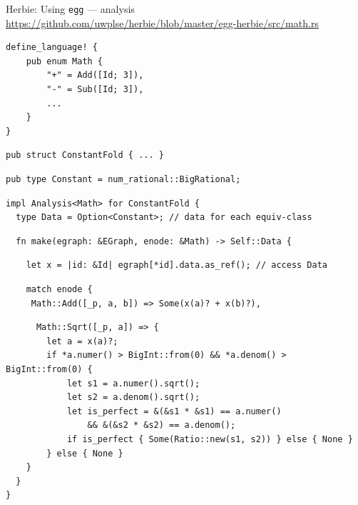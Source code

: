 \documentclass[8pt]{beamer}
\newcommand{\egg}{\texttt{egg} }
\begin{document}
\begin{frame}[fragile]{Herbie: Using \egg --- analysis}
\url{https://github.com/uwplse/herbie/blob/master/egg-herbie/src/math.rs}
{\footnotesize
\begin{verbatim}
define_language! {
    pub enum Math {
        "+" = Add([Id; 3]),
        "-" = Sub([Id; 3]),
        ...
    }
}
\end{verbatim}
\pause
\begin{verbatim}
pub struct ConstantFold { ... }
\end{verbatim}
\begin{verbatim}
pub type Constant = num_rational::BigRational;
\end{verbatim}
\pause
\begin{verbatim}
impl Analysis<Math> for ConstantFold {
  type Data = Option<Constant>; // data for each equiv-class
\end{verbatim}
\pause
\begin{verbatim}
  fn make(egraph: &EGraph, enode: &Math) -> Self::Data {
\end{verbatim}
\pause
\begin{verbatim}
    let x = |id: &Id| egraph[*id].data.as_ref(); // access Data
\end{verbatim}
\pause
\begin{verbatim}
    match enode {
     Math::Add([_p, a, b]) => Some(x(a)? + x(b)?),
\end{verbatim}
\pause
\begin{verbatim}
      Math::Sqrt([_p, a]) => {
        let a = x(a)?;
        if *a.numer() > BigInt::from(0) && *a.denom() > BigInt::from(0) {
            let s1 = a.numer().sqrt();
            let s2 = a.denom().sqrt();
            let is_perfect = &(&s1 * &s1) == a.numer() 
                && &(&s2 * &s2) == a.denom();
            if is_perfect { Some(Ratio::new(s1, s2)) } else { None }
        } else { None }
    }
  }
}
\end{verbatim}
}
\end{frame}
\end{document}
